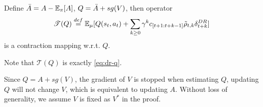 \begin{Lemma_app}
Define $\Bar{A}= A - \mathbb{E}_\pi[A]$, $Q = \Bar{A} + sg(V)$,
then operator 
$$
    \mathscr{T}(Q) \overset{def}{=} \mathbb{E}_{\mu}   [
        Q(s_t, a_t) + \sum_{k \geq 0}  \gamma^k
        c_{[t+1:t+k-1]} \Tilde{\rho}_{t, k}
        \delta^{DR}_{t+k}
        ]
$$
is a contraction mapping w.r.t. $Q$.
\label{lemma_app:dr_q}
\end{Lemma_app}
\begin{Remark_app}
Note that $\mathscr{T}(Q)$ is exactly \eqref{eq:dr-q}. 

Since $Q = A + sg(V)$, the gradient of $V$ is stopped when estimating $Q$, updating $Q$ will not change $V$, which is equivalent to updating $A$.
Without loss of generality, we assume $V$ is fixed as $V^*$ in the proof.
\end{Remark_app}
